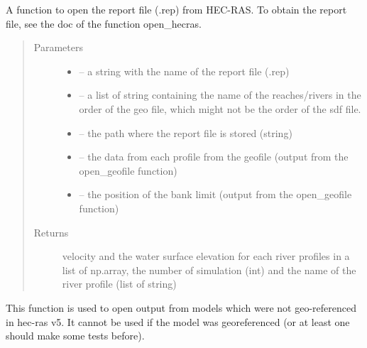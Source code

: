 \documentclass[letterpaper,10pt,english]{sphinxmanual}
\begin{document}

\begin{fulllineitems}
\label{\detokenize{index:src.Hec_ras06.open_repfile}}
A function to open the report file (.rep) from HEC-RAS. To obtain the report file, see the doc of the function
open\_hecras.
\begin{quote}\begin{description}
\item[{Parameters}] \leavevmode\begin{itemize}
\item {} 
 -- a string with the name of the report file (.rep)

\item {} 
 -- a list of string containing the name of the reaches/rivers in the order of the geo file,
which might not be the order of the sdf file.

\item {} 
 -- the path where the report file is stored (string)

\item {} 
 -- the data from each profile from the geofile (output from the open\_geofile function)

\item {} 
 -- the position of the bank limit (output from the open\_geofile function)

\end{itemize}

\item[{Returns}] \leavevmode
velocity and the water surface elevation for each river profiles in a list of np.array,
the number of simulation (int) and the name of the river profile (list of string)

\end{description}\end{quote}


This function is used to open output from models which were not geo-referenced in hec-ras v5. It cannot be used if
the model was georeferenced (or at least one should make some tests before).


\end{fulllineitems}
\end{document}
